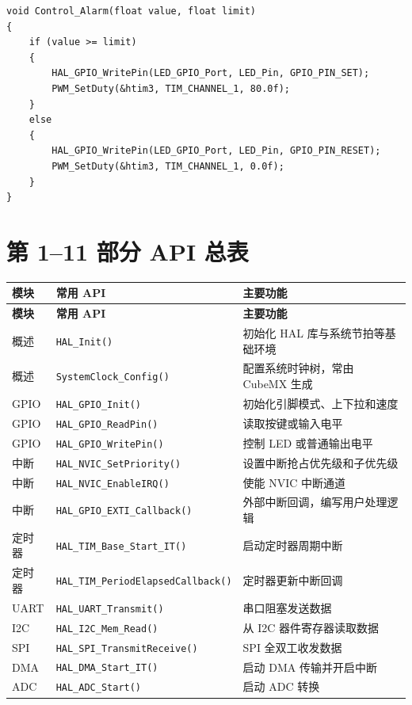 \documentclass[UTF8,fontset=none,12pt]{ctexart}
\newcommand{\api}[1]{{\footnotesize\nolinkurl{#1}}}
\begin{document}
\begin{lstlisting}[style=cstyle]
void Control_Alarm(float value, float limit)
{
    if (value >= limit)
    {
        HAL_GPIO_WritePin(LED_GPIO_Port, LED_Pin, GPIO_PIN_SET);
        PWM_SetDuty(&htim3, TIM_CHANNEL_1, 80.0f);
    }
    else
    {
        HAL_GPIO_WritePin(LED_GPIO_Port, LED_Pin, GPIO_PIN_RESET);
        PWM_SetDuty(&htim3, TIM_CHANNEL_1, 0.0f);
    }
}
\end{lstlisting}

\section{第 1--11 部分 API 总表}
\begin{center}
\small
\begin{longtable}{@{}p{2.4cm}p{5.5cm}p{7.5cm}@{}}
\toprule
\textbf{模块} & \textbf{常用 API} & \textbf{主要功能} \\
\midrule
\endfirsthead
\toprule
\textbf{模块} & \textbf{常用 API} & \textbf{主要功能} \\
\midrule
\endhead
概述 & \api{HAL_Init()} & 初始化 HAL 库与系统节拍等基础环境 \\
概述 & \api{SystemClock_Config()} & 配置系统时钟树，常由 CubeMX 生成 \\
GPIO & \api{HAL_GPIO_Init()} & 初始化引脚模式、上下拉和速度 \\
GPIO & \api{HAL_GPIO_ReadPin()} & 读取按键或输入电平 \\
GPIO & \api{HAL_GPIO_WritePin()} & 控制 LED 或普通输出电平 \\
中断 & \api{HAL_NVIC_SetPriority()} & 设置中断抢占优先级和子优先级 \\
中断 & \api{HAL_NVIC_EnableIRQ()} & 使能 NVIC 中断通道 \\
中断 & \api{HAL_GPIO_EXTI_Callback()} & 外部中断回调，编写用户处理逻辑 \\
定时器 & \api{HAL_TIM_Base_Start_IT()} & 启动定时器周期中断 \\
定时器 & \api{HAL_TIM_PeriodElapsedCallback()} & 定时器更新中断回调 \\
UART & \api{HAL_UART_Transmit()} & 串口阻塞发送数据 \\
I2C & \api{HAL_I2C_Mem_Read()} & 从 I2C 器件寄存器读取数据 \\
SPI & \api{HAL_SPI_TransmitReceive()} & SPI 全双工收发数据 \\
DMA & \api{HAL_DMA_Start_IT()} & 启动 DMA 传输并开启中断 \\
ADC & \api{HAL_ADC_Start()} & 启动 ADC 转换 \\

\end{longtable}
\end{center}
\end{document}
